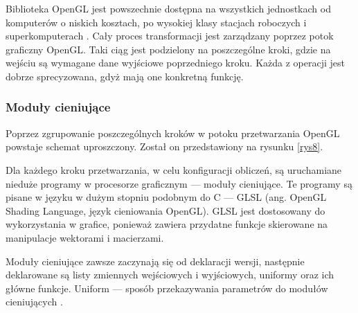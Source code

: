 Biblioteka OpenGL jest powszechnie dostępna na wszystkich jednostkach od komputerów o niskich kosztach, po wysokiej klasy stacjach roboczych i superkomputerach \cite{openglofficial}. Cały proces transformacji jest zarządzany poprzez potok graficzny OpenGL. Taki ciąg jest podzielony na poszczególne kroki, gdzie na wejściu są wymagane dane wyjściowe poprzedniego kroku. Każda z operacji jest dobrze sprecyzowana, gdyż mają one konkretną funkcję. 

\subsubsection{Moduły cieniujące}
Poprzez zgrupowanie poszczególnych kroków w potoku przetwarzania OpenGL powstaje schemat uproszczony. Został on przedstawiony na rysunku \ref{rys8}.

Dla każdego kroku przetwarzania, w celu konfiguracji obliczeń, są uruchamiane nieduże programy w procesorze graficznym --- moduły cieniujące. Te programy są pisane w języku w dużym stopniu podobnym do C --- GLSL (ang. OpenGL Shading Language, język cieniowania OpenGL). GLSL jest dostosowany do wykorzystania w grafice, ponieważ zawiera przydatne funkcje skierowane na manipulacje wektorami i macierzami. 

Moduły cieniujące zawsze zaczynają się od deklaracji wersji, następnie deklarowane są listy zmiennych wejściowych i wyjściowych, uniformy oraz ich główne funkcje. Uniform --- sposób przekazywania parametrów do modułów cieniujących \cite{slownik}. 

